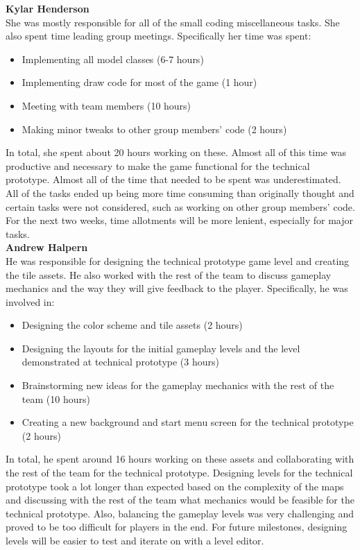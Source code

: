 \documentclass[]{article}
\begin{document}
\textbf{Kylar Henderson} \\
She was mostly responsible for all of the small coding miscellaneous tasks. 
She also spent time leading group meetings. Specifically her time was spent:
\begin{itemize}
\item Implementing all model classes (6-7 hours)
\item Implementing draw code for most of the game (1 hour)
\item Meeting with team members (10 hours)
\item Making minor tweaks to other group members' code (2 hours)
\end{itemize}
In total, she spent about 20 hours working on these. Almost all of
this time was productive and necessary to make the game functional for
the technical prototype. Almost all of the time that needed to be
spent was underestimated. All of the tasks ended up being more time
consuming than originally thought and certain tasks were not
considered, such as working on other group members' code. For the next
two weeks, time allotments will be more lenient, especially for major
tasks. \\

\textbf{Andrew Halpern} \\
He was responsible for designing the technical prototype game level
and creating the tile assets. He also worked with the rest of the team
to discuss gameplay mechanics and the way they will give feedback to
the player. Specifically, he was involved in:
\begin{itemize}
\item Designing the color scheme and tile assets (2 hours)
\item Designing the layouts for the initial gameplay levels and the 
  level demonstrated at technical prototype (3 hours)
\item Brainstorming new ideas for the gameplay mechanics with the 
  rest of the team (10 hours)
\item Creating a new background and start menu screen for the 
  technical prototype (2 hours)
\end{itemize}
In total, he spent around 16 hours working on these assets and
collaborating with the rest of the team for the technical
prototype. Designing levels for the technical prototype took a lot
longer than expected based on the complexity of the maps and
discussing with the rest of the team what mechanics would be feasible
for the technical prototype. Also, balancing the gameplay levels was
very challenging and proved to be too difficult for players in the
end. For future milestones, designing levels will be easier to test
and iterate on with a level editor. \\
\end{document}
